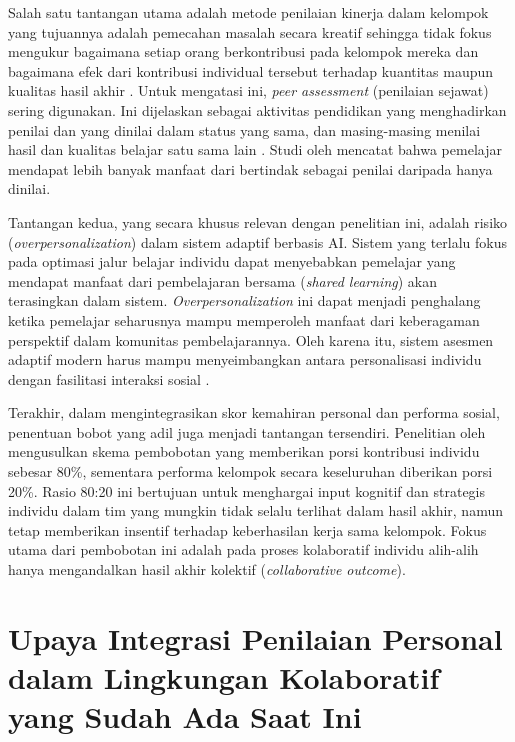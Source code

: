 Salah satu tantangan utama adalah metode penilaian kinerja dalam kelompok
yang tujuannya adalah pemecahan masalah secara kreatif sehingga tidak fokus mengukur bagaimana setiap orang berkontribusi pada kelompok mereka dan bagaimana efek dari kontribusi individual tersebut terhadap kuantitas maupun kualitas hasil akhir \autocite{Ryoo2021}. Untuk mengatasi ini, \textit{peer assessment} (penilaian sejawat) sering digunakan. Ini dijelaskan sebagai aktivitas pendidikan yang menghadirkan penilai dan yang dinilai dalam status yang sama,
dan masing-masing menilai hasil dan kualitas belajar satu sama lain
\autocite{Ihichr2024}. Studi oleh \textcite{Ihichr2024} mencatat bahwa pemelajar mendapat lebih banyak manfaat dari bertindak sebagai penilai daripada hanya dinilai.

Tantangan kedua, yang secara khusus relevan dengan penelitian ini, adalah risiko (\textit{overpersonalization}) dalam sistem adaptif
berbasis AI. Sistem yang terlalu fokus pada optimasi jalur belajar individu dapat
menyebabkan pemelajar yang mendapat manfaat dari pembelajaran
bersama (\textit{shared learning}) akan terasingkan dalam sistem.
\textit{Overpersonalization} ini dapat menjadi penghalang ketika pemelajar seharusnya mampu memperoleh manfaat dari keberagaman perspektif dalam komunitas pembelajarannya. Oleh karena itu,
sistem asesmen adaptif modern harus mampu menyeimbangkan antara personalisasi
individu dengan fasilitasi interaksi sosial \autocite{Halkiopoulos2024}.

Terakhir, dalam mengintegrasikan skor kemahiran personal dan performa sosial, penentuan bobot yang adil juga menjadi tantangan tersendiri. Penelitian oleh \textcite{Demetroulis2024} mengusulkan skema pembobotan yang memberikan porsi kontribusi individu sebesar 80\%, sementara performa kelompok secara keseluruhan diberikan porsi 20\%. Rasio 80:20 ini bertujuan untuk menghargai input kognitif dan strategis individu dalam tim yang mungkin tidak selalu terlihat dalam hasil akhir, namun tetap memberikan insentif terhadap keberhasilan kerja sama kelompok. Fokus utama dari pembobotan ini adalah pada proses kolaboratif individu alih-alih hanya mengandalkan hasil akhir kolektif (\textit{collaborative outcome}).

\section{Upaya Integrasi Penilaian Personal dalam Lingkungan Kolaboratif yang Sudah Ada Saat Ini}
\label{sec:upaya_integrasi}

